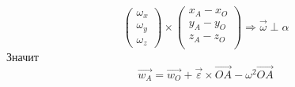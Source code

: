 \begin{corollary}
\begin{enumerate}
\[\begin{pmatrix}
            \omega_x\\ \omega_y \\ \omega_z
        \end{pmatrix} \times \begin{pmatrix}
            x_A - x_O\\y_A - y_O\\z_A - z_O\\
        \end{pmatrix} \Longrightarrow \vec{\omega} \perp \alpha
        \]
        Значит
        \[
        \vec{w_A} = \vec{w_O} + \vec{\varepsilon} \times \vec{OA} - \omega^2\vec{OA}
        \]
    \end{enumerate}
\end{corollary}